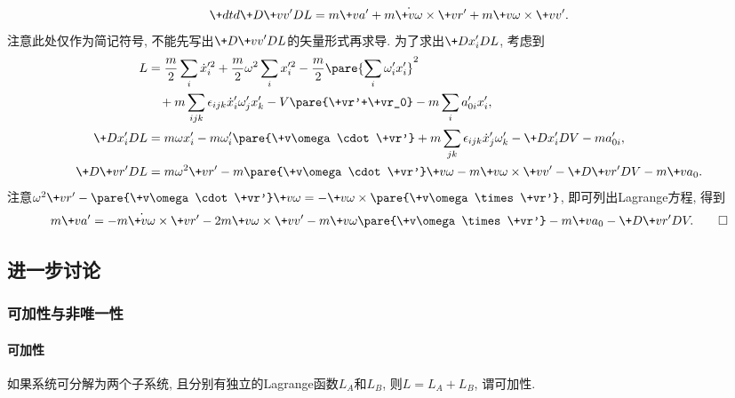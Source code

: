 \documentclass[../LectureNotes.tex]{subfiles}
\begin{document}
\begin{sample}
\begin{ex}
        \[ \+dtd{}\+D{\+vv'}D{L} = m\+va' + m\dot{\+v\omega}\times\+vr' + m\+v\omega\times\+vv'. \]
        注意此处仅作为简记符号, 不能先写出$\displaystyle \+D{\+vv'}D{L}$的矢量形式再求导. 为了求出$\displaystyle \+D{x'_i}D{L}$, 考虑到
        \begin{align*}
            L &= \frac{m}{2}\sum_i \dot{x}'^2_i + \frac{m}{2}\omega^2\sum_i x'^2_i - \frac{m}{2}\pare{\sum_i \omega'_i x'_i}^2  \\
            &\phantom{=}\, + m\sum_{ijk} \epsilon_{ijk} \dot{x}'_i\omega'_jx'_k - V\pare{\+vr'+\+vr_0} - m\sum_i a'_{0i}x'_i,\\
            \displaystyle \+D{x'_i}D{L} &= m\omega x'_i - m\omega'_i\pare{\+v\omega\cdot\+vr'} + m\sum_{jk} \epsilon_{ijk} \dot{x}'_j \omega'_k - \+D{x'_i}DV - ma'_{0i},\\
            \+D{\+vr'}DL &= m\omega^2 \+vr' - m\pare{\+v\omega\cdot\+vr'}\+v\omega - m\+v\omega\times\+vv' - \+D{\+vr'}D{V} - m\+va_0.
        \end{align*}
        注意$\omega^2\+vr' - \pare{\+v\omega\cdot\+vr'}\+v\omega = -\+v\omega\times\pare{\+v\omega\times\+vr'}$, 即可列出Lagrange方程, 得到
        \[ m\+va' = -m\dot{\+v\omega}\times\+vr' - 2m\+v\omega\times\+vv' - m\+v\omega\pare{\+v\omega\times \+vr'} - m\+va_0 - \+D{\+vr'}D{V}.\qedhere \]
    \end{ex}
\end{sample}



\subsection{进一步讨论} %
\label{sub:进一步讨论}

\subsubsection{可加性与非唯一性} %
\label{ssub:可加性与非唯一性}

\paragraph{可加性} %
\label{par:可加性}

如果系统可分解为两个子系统, 且分别有独立的Lagrange函数$L_A$和$L_B$, 则$L = L_A+L_B$, 谓可加性.

\end{document}
